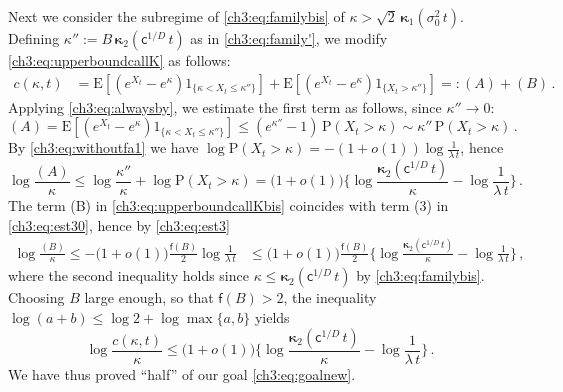 \documentclass[a4paper,reqno,11pt]{amsart}
\numberwithin{equation}{section}
\newcommand{\PEfont}{\mathrm}
\renewcommand{\P}{\ensuremath{\PEfont P}}
\newcommand{\E}{\ensuremath{\PEfont E}}
\newcommand\sfc{\mathsf{c}}
\newcommand\sff{\mathsf{f}}
\newcommand\bkappa{\boldsymbol{\kappa}}
\newcommand\blue{\color{blue}}
\begin{document}
Next we consider the subregime of \eqref{ch3:eq:familybis} 
of $\kappa > \sqrt{2} \, \bkappa_1(\sigma_0^2 \, t)$.
Defining $\kappa'' := B \,\bkappa_2(\sfc^{1/D} \, t)$ as in \eqref{ch3:eq:family'},
we modify \eqref{ch3:eq:upperboundcallK} as follows:
\begin{equation}\label{ch3:eq:upperboundcallKbis}
 \begin{split}
c(\kappa,t) &=\E\left[(e^{X_t}-e^{\kappa})1_{\{\kappa < X_t \le 
\kappa''\}}\right] +\E\left[(e^{X_t}-e^{\kappa})1_{\{X_t>\kappa''\}}\right]
=: (A) + (B) \,.
 \end{split}
\end{equation}
Applying \eqref{ch3:eq:alwaysby}, we estimate the first term as follows,
since $\kappa'' \to 0$:
\begin{equation*}
	(A) = \E\left[(e^{X_t}-e^{\kappa})1_{\{\kappa < X_t \le 
	\kappa''\}}\right] \le (e^{\kappa''}-1) \, \P(X_t > \kappa)
	\sim \kappa'' \, \P(X_t > \kappa) \,.
\end{equation*}
By \eqref{ch3:eq:withoutfa1} we have
$\log \P(X_t > \kappa) = -(1+o(1))\log \frac{1}{\lambda \, t}$,
hence
\begin{equation*}
	\log \frac{(A)}{\kappa} \le \log\frac{\kappa''}{\kappa}
	+ \log\P(X_t > \kappa) 
	= \big(1+o(1)\big)  \bigg\{ \log \frac{\bkappa_2(\sfc^{1/D} \, t)}{\kappa}
	-  \log \frac{1}{\lambda \, t} \bigg\} \,.
\end{equation*}
The term (B) in \eqref{ch3:eq:upperboundcallKbis} coincides with term
(3) in \eqref{ch3:eq:est30}, hence by \eqref{ch3:eq:est3} 
\begin{equation} \label{eq:neweq}
\begin{split}
	\log \frac{(B)}{\kappa} \le -\big(1+o(1)\big) \frac{\sff(B)}{2} \log\frac{1}{\lambda \, t} 
	& \le \big(1+o(1)\big)  
	\frac{\sff(B)}{2} \bigg\{ \log \frac{\bkappa_2(\sfc^{1/D} \, t)}{\kappa}
	-  \log \frac{1}{\lambda \, t} \bigg\} \,,
\end{split}
\end{equation}
where the second inequality holds since
$\kappa \le \bkappa_2(\sfc^{1/D} \, t)$ by \eqref{ch3:eq:familybis}.
Choosing $B$ large enough, so that $\sff(B) > 2$,
the inequality $\log(a+b) \le \log 2 + \log\max\{a,b\}$ yields
\begin{equation}\label{ch3:eq:ub}
	\log \frac{c(\kappa,t)}{\kappa} \le \big(1+o(1)\big) \bigg\{ \log 
	\frac{\bkappa_2(\sfc^{1/D} \, t)}{\kappa}
	-  \log \frac{1}{\lambda \, t} \bigg\} \,.
\end{equation}
We have thus proved ``half'' of our goal \eqref{ch3:eq:goalnew}.
\end{document}
